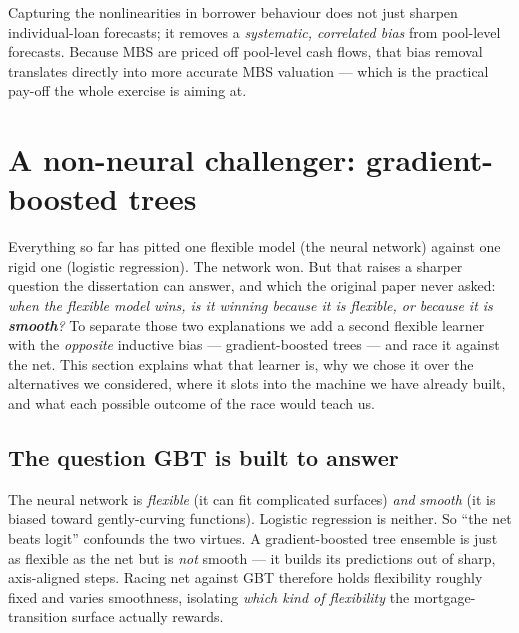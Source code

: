 \documentclass[11pt]{article}
\begin{document}
\begin{keyidea}
Capturing the nonlinearities in borrower behaviour does not just sharpen individual-loan
forecasts; it removes a \emph{systematic, correlated bias} from pool-level forecasts. Because
MBS are priced off pool-level cash flows, that bias removal translates directly into more
accurate MBS valuation --- which is the practical pay-off the whole exercise is aiming at.
\end{keyidea}

\section{A non-neural challenger: gradient-boosted trees}
\label{sec:gbt}

Everything so far has pitted one flexible model (the neural network) against one rigid one
(logistic regression). The network won. But that raises a sharper question the dissertation
can answer, and which the original paper never asked: \emph{when the flexible model wins, is
it winning because it is flexible, or because it is \textbf{smooth}?} To separate those two
explanations we add a second flexible learner with the \emph{opposite} inductive bias ---
gradient-boosted trees --- and race it against the net. This section explains what that
learner is, why we chose it over the alternatives we considered, where it slots into the
machine we have already built, and what each possible outcome of the race would teach us.

\subsection{The question GBT is built to answer}

\begin{keyidea}
The neural network is \emph{flexible} (it can fit complicated surfaces) \emph{and} \emph{smooth}
(it is biased toward gently-curving functions). Logistic regression is neither. So ``the net
beats logit'' confounds the two virtues. A gradient-boosted tree ensemble is just as flexible
as the net but is \emph{not} smooth --- it builds its predictions out of sharp, axis-aligned
steps. Racing net against GBT therefore holds flexibility roughly fixed and varies smoothness,
isolating \emph{which kind of flexibility} the mortgage-transition surface actually rewards.
\end{keyidea}
\end{document}
